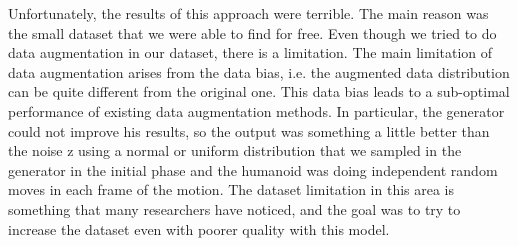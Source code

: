 Unfortunately, the results of this approach were terrible. The main reason was the small dataset that we were able to find for free. Even though we tried to do data augmentation in our dataset, there is a limitation. The main limitation of data augmentation arises from the data bias, i.e. the augmented data distribution can be quite different from the original one. This data bias leads to a sub-optimal performance of existing data augmentation methods. In particular, the generator could not improve his results, so the output was something a little better than the  noise z using a normal or uniform distribution that we sampled in the generator in the initial phase and the humanoid was doing independent random moves in each frame of the motion. The dataset limitation in this area is something that many researchers have noticed, and the goal was to try to increase the dataset even with poorer quality with this model. 